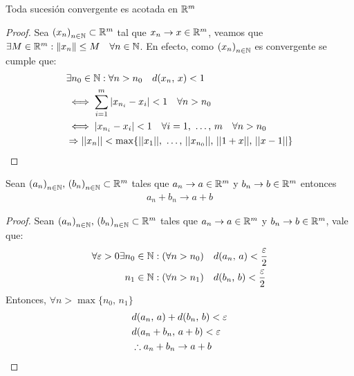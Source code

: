 \begin{prop}
  Toda sucesión convergente es acotada en \( \mathbb{R}^m \)
  \begin{proof}
    Sea \( {(x_n)}_{n \in \mathbb{N}} \subset \mathbb{R}^m \) tal que \( x_n \to x \in \mathbb{R}^m \), veamos que \( \exists M \in \mathbb{R}^m : \|x_n\| \leq M \quad \forall n \in \mathbb{N} \).
    En efecto, como \( {(x_n)}_{n \in \mathbb{N}} \) es convergente se cumple que:\begin{align*}
       & \exists n_0 \in \mathbb{N} : \forall n > n_0 \quad d(x_n\text{, }x) < 1                                              \\
       & \iff \sum_{i = 1}^m |x_{n_i} - x_i| < 1 \quad \forall n > n_0                                                \\
       & \iff |x_{n_i} - x_i| < 1 \quad \forall i = 1\text{, } \ldots\text{, }m \quad \forall n > n_0                 \\
       & \Rightarrow ||x_n|| < \max \{ ||x_1||\text{, }\ldots\text{, }||x_{n_0}||\text{, }||1+x||\text{, } ||x-1|| \}
    \end{align*}
  \end{proof}
\end{prop}

\begin{prop}
  Sean \( {(a_n)}_{n \in \mathbb{N}}\text{, } {(b_n)}_{n \in \mathbb{N}} \subset \mathbb{R}^m \) tales que \( a_n \to a \in \mathbb{R}^m \) y \( b_n \to b \in \mathbb{R}^m \) entonces\begin{align*}
    a_n + b_n \to a+b
  \end{align*}
  \begin{proof}
    Sean \( {(a_n)}_{n \in \mathbb{N}}\text{, } {(b_n)}_{n \in \mathbb{N}} \subset \mathbb{R}^m \) tales que \( a_n \to a \in \mathbb{R}^m \) y \( b_n \to b \in \mathbb{R}^m \), vale que:\begin{align*}
      \forall \varepsilon > 0 \exists & n_0 \in \mathbb{N} : (\forall n > n_0) \quad d(a_n \text{, }a) < \frac{\varepsilon}{2} \\
                             & n_1 \in \mathbb{N} : (\forall n > n_1) \quad d(b_n\text{, }b) < \frac{\varepsilon}{2}
    \end{align*}
    Entonces, \( \forall n > \max \{ n_0\text{, }n_1 \} \)\begin{align*}
       & d(a_n\text{, }a) + d(b_n\text{, }b) < \varepsilon \\
       & d(a_n + b_n\text{, }a+b) < \varepsilon            \\
       & \therefore a_n + b_n \to a+b
    \end{align*}
  \end{proof}
\end{prop}

